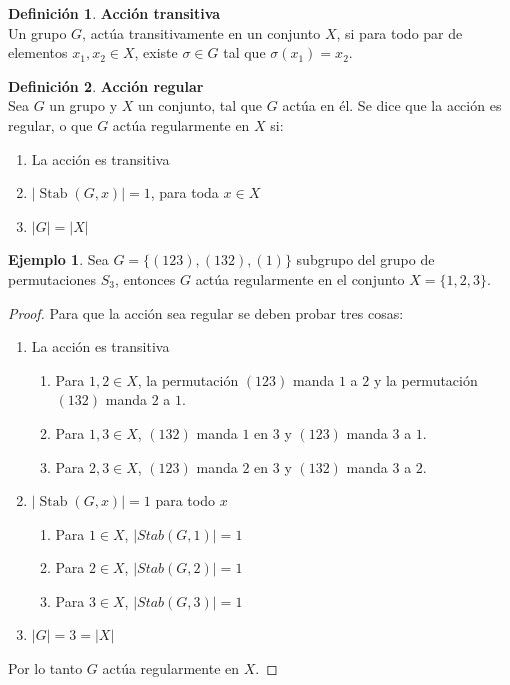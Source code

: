 \documentclass[12pt]{book}
\theoremstyle{definition}
\newtheorem{definition}{Definición}
\newtheorem{example}{Ejemplo}
\DeclareMathOperator{\Stab}{Stab}
\begin{document}
\begin{definition}\textbf{Acción transitiva}\\
  Un grupo $G$, actúa transitivamente en un conjunto $X$, si para todo
  par de elementos $x_1, x_2 \in X$, existe $\sigma \in G$ tal que $\sigma (x_1) = x_2$.
\end{definition}



\begin{definition}\textbf{Acción regular}\\
  Sea $G$ un grupo y $X$ un conjunto, tal que $G$ actúa en él. Se dice que la acción es regular, o
  que $G$ actúa regularmente en $X$ si:
  \begin{enumerate}
  \item La acción es transitiva
  \item $|\Stab (G,x)|=1$, para toda $x\in X$
  \item $|G|=|X|$
  \end{enumerate}
\end{definition}


\begin{example}
  Sea $G=\{ (123),(132),(1)\}$ subgrupo del grupo de permutaciones $S_3$, entonces $G$
  actúa regularmente en el conjunto $X=\{ 1,2,3\}$.
\begin{proof} Para que la acción sea regular se deben probar tres cosas:

  \begin{enumerate}
  \item La acción es transitiva
    \begin{enumerate}
    \item Para $1,2\in X$, la permutación $(123)$ manda $1$ a $2$ y la
      permutación $(132)$ manda $2$ a $1$.
    \item Para $1,3\in X$, $(132)$ manda $1$ en $3$ y $(123)$ manda
      $3$ a $1$.
    \item Para $2,3\in X$, $(123)$ manda $2$ en $3$ y $(132)$ manda
      $3$ a $2$.
    \end{enumerate}
  \item $|\Stab (G,x)|=1$ para todo $x$
    \begin{enumerate}
    \item Para $1\in X$, $|Stab (G,1)|=1$
    \item Para $2\in X$, $|Stab (G,2)|=1$
    \item Para $3\in X$, $|Stab (G,3)|=1$
    \end{enumerate}
  \item $|G|=3=|X|$
  \end{enumerate}
  Por lo tanto $G$ actúa regularmente en $X$.
\end{proof}
\end{example}
\end{document}
